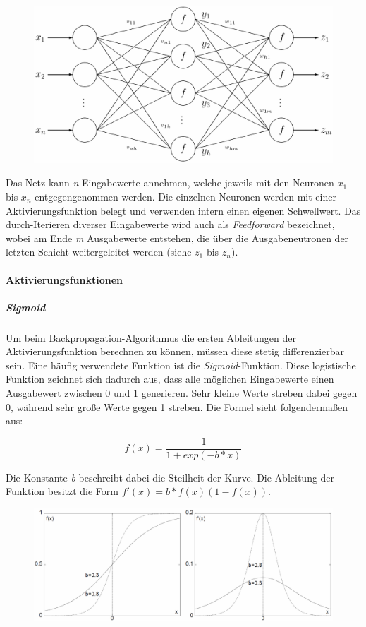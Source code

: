 \begin{figure}[!htb]
	\centering
	\includegraphics[width=.8\linewidth]{./img/mlp1}
	\label{fig:mlpAufbau}
\end{figure}

Das Netz kann \emph{n} Eingabewerte annehmen, welche jeweils mit den Neuronen $x_1$ bis $x_n$ entgegengenommen werden. Die einzelnen Neuronen werden mit einer Aktivierungsfunktion belegt und verwenden intern einen eigenen Schwellwert. Das durch-Iterieren diverser Eingabewerte wird auch als \emph{Feedforward} bezeichnet, wobei am Ende \emph{m} Ausgabewerte entstehen, die über die Ausgabeneutronen der letzten Schicht weitergeleitet werden (siehe $z_1$ bis $z_n$).

\FloatBarrier

\paragraph{Aktivierungsfunktionen}

\subparagraph{Sigmoid}
Um beim Backpropagation-Algorithmus die ersten Ableitungen der Aktivierungsfunktion berechnen zu können, müssen diese stetig differenzierbar sein. Eine häufig verwendete Funktion ist die \emph{Sigmoid}-Funktion. Diese logistische Funktion zeichnet sich dadurch aus, dass alle möglichen Eingabewerte einen Ausgabewert zwischen 0 und 1 generieren. Sehr kleine Werte streben dabei gegen 0, während sehr große Werte gegen 1 streben. Die Formel sieht folgendermaßen aus:

\begin{equation}
f(x) = \frac{1}{1 + exp(-b * x)}
\end{equation}

Die Konstante \emph{b} beschreibt dabei die Steilheit der Kurve. Die Ableitung der Funktion besitzt die Form $f'(x) = b * f(x)(1-f(x))$.

\begin{figure}[!htb]
	\centering
	\includegraphics[width=.8\linewidth]{./img/plotSigmoid}
	\label{fig:mlpSigmoid}
\end{figure}



